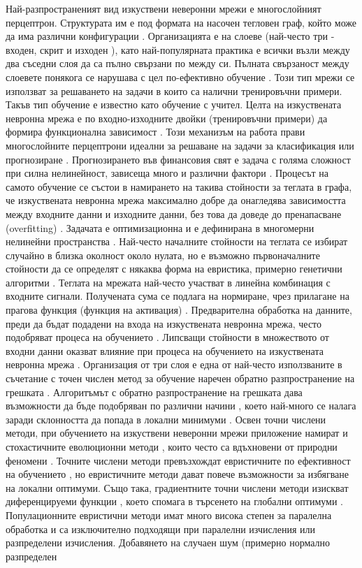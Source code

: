 Най-разпространеният вид изкуствени неверонни мрежи е многослойният перцептрон. Структурата им е под формата на насочен тегловен граф, който може да има различни конфигурации \cite{da-Silva-01}. Организацията е на слоеве \cite{Jain-02} (най-често три - входен, скрит и изходен \cite{Pradhan-01}), като най-популярната практика е всички възли между два съседни слоя да са пълно свързани по между си. Пълната свързаност между слоевете понякога се нарушава с цел по-ефективно обучение \cite{Mocanu-01}. Този тип мрежи се използват за решаването на задачи в които са налични тренировъчни примери. Такъв тип обучение е известно като обучение с учител. Целта на изкуствената невронна мрежа е по входно-изходните двойки (тренировъчни примери) да формира функционална зависимост \cite{Kattan-01}. Този механизъм на работа прави многослойните перцептрони идеални за решаване на задачи за класификация \cite{Kubat-01} или прогнозиране \cite{Basheer-01}. Прогнозирането във финансовия свят е задача с голяма сложност при силна нелинейност, зависеща много и различни фактори \cite{Bing-01}. Процесът на самото обучение се състои в намирането на такива стойности за теглата в графа, че изкуствената невронна мрежа максимално добре да онагледява зависимостта между входните данни и изходните данни, без това да доведе до пренапасване (overfitting) \cite{Bilbao-01}. Задачата е оптимизационна и е дефинирана в многомерни нелинейни пространства \cite{Kingston-01}. Най-често началните стойности на теглата се избират случайно в близка околност около нулата, но е възможно първоначалните стойности да се определят с някаква форма на евристика, примерно генетични алгоритми \cite{Chandwani-01}. Теглата на мрежата най-често участват в линейна комбинация с входните сигнали. Получената сума се подлага на нормиране, чрез прилагане на прагова функция (функция на активация) \cite{Ertugrul-01}. Предварителна обработка на данните, преди да бъдат подадени на входа на изкуствената невронна мрежа, често подобряват процеса на обучението \cite{Nawi-01}. Липсващи стойности в множеството от входни данни оказват влияние при процеса на обучението на изкуствената невронна мрежа \cite{Viharos-01}. Организация от три слоя е една от най-често използваните в съчетание с точен числен метод за обучение наречен обратно разпространение на грешката \cite{Pomerleau-01}. Алгоритъмът с обратно разпространение на грешката дава възможности да бъде подобряван по различни начини \cite{Kollias-01}, което най-много се налага заради склонността да попада в локални минимуми \cite{Chen-02}. Освен точни числени методи, при обучението на изкуствени неверонни мрежи приложение намират и стохастичните еволюционни методи \cite{Slowik-01}, които често са вдъхновени от природни феномени \cite{Cui-01}. Точните числени методи превъзхождат евристичните по ефективност на обучението \cite{Piotrowski-01}, но евристичните методи дават повече възможности за избягване на локални оптимуми. Също така, градиентните точни числени методи изискват диференцируеми функции \cite{Karaboga-01}, което спомага в търсенето на глобални оптимуми \cite{Roy-01}. Популационните евристични методи имат много висока степен за паралелна обработка и са изключително подходящи при паралелни изчисления \cite{Ding-01} или разпределени изчисления. Добавянето на случаен шум (примерно нормално разпределен 